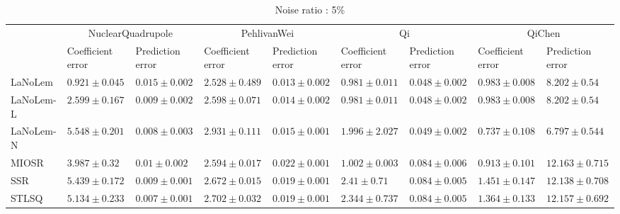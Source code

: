 \begin{table*}
\centering
\caption{Noise ratio : 5\%}
\label{}
\scalebox{0.7}
{
\begin{tabular}{lllllllll}
\toprule
 & \multicolumn{2}{c}{NuclearQuadrupole} & \multicolumn{2}{c}{PehlivanWei} & \multicolumn{2}{c}{Qi} & \multicolumn{2}{c}{QiChen} \\
 & Coefficient error & Prediction error & Coefficient error & Prediction error & Coefficient error & Prediction error & Coefficient error & Prediction error \\
\midrule
LaNoLem & $\mathbf{0.921}\pm 0.045$ & $0.015\pm 0.002$ & $\mathbf{2.528}\pm 0.489$ & $\mathbf{0.013}\pm 0.002$ & $0.981\pm 0.011$ & $0.048\pm 0.002$ & $0.983\pm 0.008$ & $8.202\pm 0.54$ \\
LaNoLem-L & $2.599\pm 0.167$ & $0.009\pm 0.002$ & $2.598\pm 0.071$ & $0.014\pm 0.002$ & $\mathbf{0.981}\pm 0.011$ & $\mathbf{0.048}\pm 0.002$ & $0.983\pm 0.008$ & $8.202\pm 0.54$ \\
LaNoLem-N & $5.548\pm 0.201$ & $0.008\pm 0.003$ & $2.931\pm 0.111$ & $0.015\pm 0.001$ & $1.996\pm 2.027$ & $0.049\pm 0.002$ & $\mathbf{0.737}\pm 0.108$ & $\mathbf{6.797}\pm 0.544$ \\
MIOSR & $3.987\pm 0.32$ & $0.01\pm 0.002$ & $2.594\pm 0.017$ & $0.022\pm 0.001$ & $1.002\pm 0.003$ & $0.084\pm 0.006$ & $0.913\pm 0.101$ & $12.163\pm 0.715$ \\
SSR & $5.439\pm 0.172$ & $0.009\pm 0.001$ & $2.672\pm 0.015$ & $0.019\pm 0.001$ & $2.41\pm 0.71$ & $0.084\pm 0.005$ & $1.451\pm 0.147$ & $12.138\pm 0.708$ \\
STLSQ & $5.134\pm 0.233$ & $\mathbf{0.007}\pm 0.001$ & $2.702\pm 0.032$ & $0.019\pm 0.001$ & $2.344\pm 0.737$ & $0.084\pm 0.005$ & $1.364\pm 0.133$ & $12.157\pm 0.692$ \\

\midrule


\end{tabular}}
\end{table*}
